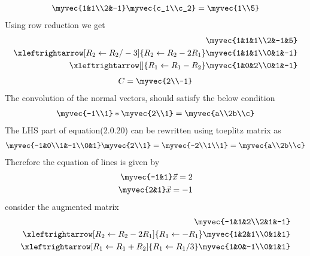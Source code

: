 \documentclass[journal,12pt,twocolumn]{IEEEtran}
\begin{document}
 \begin{align}
 \myvec{1&1\\2&-1}\myvec{c_1\\c_2}=\myvec{1\\5}
 \end{align}
 Using row reduction we get
 \begin{align}
\myvec{1&1&1\\2&-1&5}\\
\xleftrightarrow[R_2\leftarrow R_2/-3]{R_2\leftarrow R_2-2R_1}
\myvec{1&1&1\\0&1&-1}\\\xleftrightarrow[]{R_1\leftarrow R_1-R_2}
\myvec{1&0&2\\0&1&-1}
\end{align}
\begin{align}
C  =\myvec{2\\-1}
\end{align}
 The convolution of the normal vectors, should satisfy the below condition
 \begin{align}
    \myvec{-1\\1}*\myvec{2\\1}=\myvec{a\\2b\\c}
\end{align}
The LHS part of equation(2.0.20) can be rewritten using toeplitz matrix as
\begin{align}
    \myvec{-1&0\\1&-1\\0&1}\myvec{2\\1}=\myvec{-2\\1\\1}=\myvec{a\\2b\\c}
\end{align}
Therefore the equation of lines is given by 
\begin{align}
\myvec{-1&1}\vec{x}=2\\
\myvec{2&1}\vec{x}=-1
\end{align}
consider the augmented matrix
\begin{align}
\myvec{-1&1&2\\2&1&-1}\\
\xleftrightarrow[R_2\leftarrow R_2-2R_1]{R_1\leftarrow -R_1}
\myvec{1&2&1\\0&1&1}\\\xleftrightarrow[R_1\leftarrow R_1+R_2]{R_1\leftarrow R_1/3}
\myvec{1&0&-1\\0&1&1}
\end{align}
\end{document}
